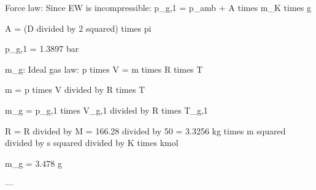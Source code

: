 Force law:  
Since EW is incompressible:  
p_g,1 = p_amb + A times m_K times g  

A = (D divided by 2 squared) times pi  

p_g,1 = 1.3897 bar  

m_g: Ideal gas law:  
p times V = m times R times T  

m = p times V divided by R times T  

m_g = p_g,1 times V_g,1 divided by R times T_g,1  

R = R divided by M = 166.28 divided by 50 = 3.3256 kg times m squared divided by s squared divided by K times kmol  

m_g = 3.478 g  

---